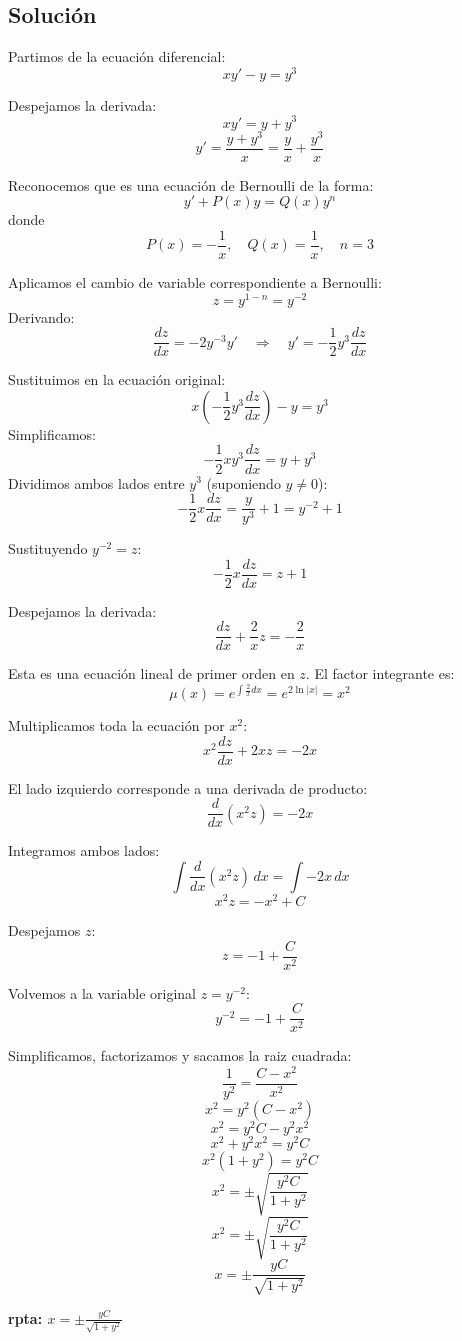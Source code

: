 \documentclass[12pt,a4paper]{article}
\begin{document}
\begin{multicols}{2}
\subsection*{Solución}
Partimos de la ecuación diferencial:
\[
xy' - y = y^3
\]

Despejamos la derivada:
\[
xy' = y + y^3
\]
\[
y' = \frac{y + y^3}{x} = \frac{y}{x} + \frac{y^3}{x}
\]

Reconocemos que es una ecuación de Bernoulli de la forma:
\[
y' + P(x)y = Q(x)y^n
\]
donde 
\[
P(x) = -\frac{1}{x}, \quad Q(x) = \frac{1}{x}, \quad n = 3
\]

\noindent
Aplicamos el cambio de variable correspondiente a Bernoulli:
\[
z = y^{1-n} = y^{-2}
\]
Derivando:
\[
\frac{dz}{dx} = -2y^{-3}y' 
\quad \Rightarrow \quad 
y' = -\frac{1}{2}y^3\frac{dz}{dx}
\]

Sustituimos en la ecuación original:
\[
x\left(-\frac{1}{2}y^3\frac{dz}{dx}\right) - y = y^3
\]
Simplificamos:
\[
-\frac{1}{2}xy^3\frac{dz}{dx} = y + y^3
\]
Dividimos ambos lados entre \( y^3 \) (suponiendo \( y \neq 0 \)):
\[
-\frac{1}{2}x\frac{dz}{dx} = \frac{y}{y^3} + 1 = y^{-2} + 1
\]

Sustituyendo \( y^{-2} = z \):
\[
-\frac{1}{2}x\frac{dz}{dx} = z + 1
\]

Despejamos la derivada:
\[
\frac{dz}{dx} + \frac{2}{x}z = -\frac{2}{x}
\]

\noindent
Esta es una ecuación lineal de primer orden en \( z \).  
El factor integrante es:
\[
\mu(x) = e^{\int \frac{2}{x}dx} = e^{2\ln|x|} = x^2
\]

Multiplicamos toda la ecuación por \( x^2 \):
\[
x^2\frac{dz}{dx} + 2xz = -2x
\]

El lado izquierdo corresponde a una derivada de producto:
\[
\frac{d}{dx}(x^2z) = -2x
\]

Integramos ambos lados:
\[
\int \frac{d}{dx}(x^2z)\,dx = \int -2x\,dx
\]
\[
x^2z = -x^2 + C
\]

Despejamos \( z \):
\[
z = -1 + \frac{C}{x^2}
\]

Volvemos a la variable original \( z = y^{-2} \):
\[
y^{-2} = -1 + \frac{C}{x^2}
\]

Simplificamos, factorizamos y sacamos la raiz cuadrada:
\[
\frac{1}{y^2} = \frac{C - x^2}{x^2}
\]
\[
x^2 = y^2(C - x^2)
\]
\[
x^2 = y^2C - y^2x^2
\]
\[
x^2 + y^2x^2= y^2C 
\]
\[
x^2(1 + y^2)= y^2C 
\]
\[
x^2 = \pm \sqrt{\frac{y^2C}{1 + y^2}}
\]
\[
x^2 = \pm \sqrt{\frac{y^2C}{1 + y^2}}
\]
\[
x = \pm \frac{yC}{\sqrt{1 + y^2}}
\]

\textbf{rpta: $x = \pm \frac{yC}{\sqrt{1 + y^2}}$}


\end{multicols}
\end{document}

